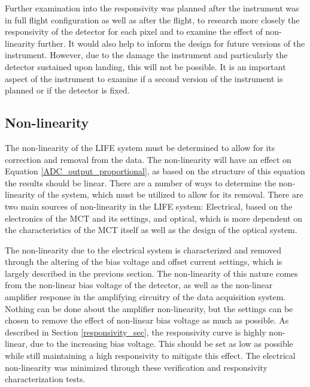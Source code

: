 Further examination into the responsivity was planned after the instrument was in full flight configuration as well as after the flight, to research more closely the responsivity of the detector for each pixel and to examine the effect of non-linearity further. It would also help to inform the design for future versions of the instrument. However, due to the damage the instrument and particularly the detector sustained upon landing, this will not be possible. It is an important aspect of the instrument to examine if a second version of the instrument is planned or if the detector is fixed.

\subsection{Non-linearity}\label{non-linearity_sec}
The non-linearity of the LIFE system must be determined to allow for its correction and removal from the data. The non-linearity will have an effect on Equation \ref{ADC_output_proportional}, as based on the structure of this equation the results should be linear. There are a number of ways to determine the non-linearity of the system, which must be utilized to allow for its removal. There are two main sources of non-linearity in the LIFE system: Electrical, based on the electronics of the MCT and its settings, and optical, which is more dependent on the characteristics of the MCT itself as well as the design of the optical system.

The non-linearity due to the electrical system is characterized and removed through the altering of the bias voltage and offset current settings, which is largely described in the previous section. The non-linearity of this nature comes from the non-linear bias voltage of the detector, as well as the non-linear amplifier response in the amplifying circuitry of the data acquisition system. Nothing can be done about the amplifier non-linearity, but the settings can be chosen to remove the effect of non-linear bias voltage as much as possible. As described in Section \ref{responsivity_sec}, the responsivity curve is highly non-linear, due to the increasing bias voltage. This should be set as low as possible while still maintaining a high responsivity to mitigate this effect. The electrical non-linearity was minimized through these verification and responsivity characterization tests.

